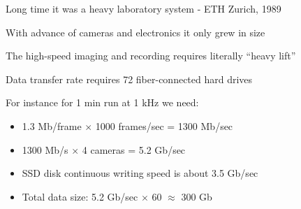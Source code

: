 
\begin{frame}[label=real-1]{Long time it was a heavy laboratory system - ETH Zurich, 1989}
    \centering{}
\end{frame}

    
\begin{frame}[label=real-2]{With advance of cameras and electronics it only grew in size}
    \centering{}
\end{frame}

\begin{frame}[label=real-3]{The high-speed imaging and recording requires literally ``heavy lift''}
\begin{multicols}{2}
\end{multicols}
\begin{cardTiny}
    Data transfer rate requires 72 fiber-connected hard drives
\end{cardTiny}
\end{frame}





\begin{frame}[label=real-4]{For instance for 1 min run at 1 kHz we need:}
    \begin{card}
    \begin{itemize}
    \item 1.3 Mb/frame $\times$ 1000 frames/sec = 1300 Mb/sec
    \item 1300 Mb/s $\times$ 4 cameras = 5.2 Gb/sec
    \item SSD disk continuous writing speed is about 3.5 Gb/sec
    \item Total data size: 5.2 Gb/sec $\times$ 60 $\approx$ 300 Gb
    \end{itemize}

    \end{card}
\end{frame}

